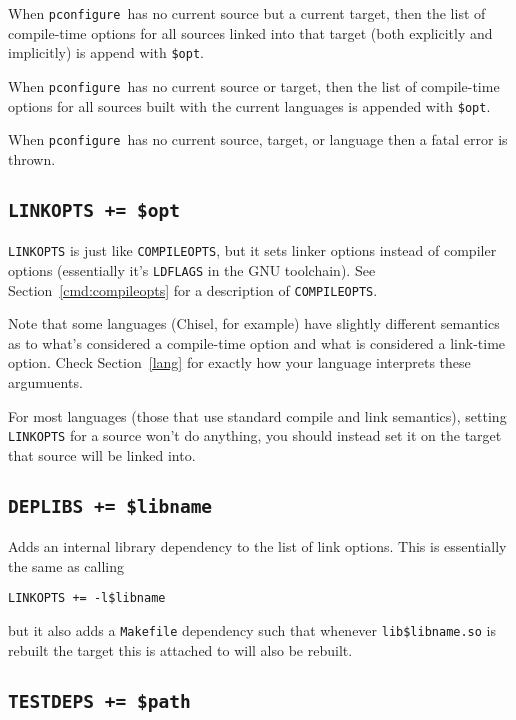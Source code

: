 \documentclass{article}
\newcommand{\pconfigure}{\texttt{pconfigure}}
\begin{document}
When \pconfigure\ has no current source but a current target, then the
list of compile-time options for all sources linked into that target
(both explicitly and implicitly) is append with \texttt{\$opt}.

When \pconfigure\ has no current source or target, then the list of
compile-time options for all sources built with the current languages
is appended with \texttt{\$opt}.

When \pconfigure\ has no current source, target, or language then a
fatal error is thrown.

\subsection{\texttt{LINKOPTS += \$opt}}

\texttt{LINKOPTS} is just like \texttt{COMPILEOPTS}, but it sets
linker options instead of compiler options (essentially it's
\texttt{LDFLAGS} in the GNU toolchain).  See
Section~\ref{cmd:compileopts} for a description of
\texttt{COMPILEOPTS}.

Note that some languages (Chisel, for example) have slightly different
semantics as to what's considered a compile-time option and what is
considered a link-time option.  Check Section~\ref{lang} for exactly
how your language interprets these argumuents.

For most languages (those that use standard compile and link
semantics), setting \texttt{LINKOPTS} for a source won't do anything,
you should instead set it on the target that source will be linked
into.

\subsection{\texttt{DEPLIBS += \$libname} \label{cmd:deplibs}}

Adds an internal library dependency to the list of link options.  This
is essentially the same as calling
\begin{verbatim}
LINKOPTS += -l$libname
\end{verbatim}
but it also adds a \texttt{Makefile} dependency such that whenever
\texttt{lib\$libname.so} is rebuilt the target this is attached to
will also be rebuilt.

\subsection{\texttt{TESTDEPS += \$path}}
\end{document}
